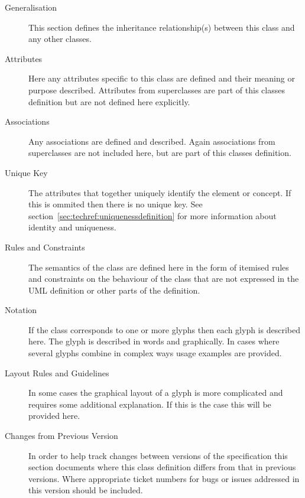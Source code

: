 \begin{description}
\item[Generalisation]  This section defines the inheritance relationship(s) between this
class and any other classes.
\item[Attributes] Here any attributes specific to this class are defined and their
meaning or purpose described. Attributes from superclasses are part of
this classes definition but are not defined here explicitly.
\item[Associations] Any associations are defined and described. Again associations from
superclasses are not included here, but are part of this classes
definition.
\item[Unique Key] The attributes that together uniquely identify the
  \PD element or concept. If this is ommited then there is no unique
  key. See section~\ref{sec:techref:uniquenessdefinition} for more
  information about identity and uniqueness.
\item[Rules and Constraints] The semantics of the class are defined
  here in the form of itemised rules and constraints on the behaviour
  of the class that are not expressed in the UML definition or other
  parts of the definition.
\item[Notation] If the class corresponds to one or more glyphs then each glyph is
described here. The glyph is described in words and graphically. In
cases where several glyphs combine in complex ways usage examples are
provided.
\item[Layout Rules and Guidelines] In some cases the graphical layout of a glyph is more complicated
and requires some additional explanation. If this is the case this
will be provided here.
\item[Changes from Previous Version] In order to help track changes between versions of the specification
this section documents where this class definition differs from
that in previous versions. Where appropriate ticket numbers for bugs
or issues addressed in this version should be included.
\end{description}



